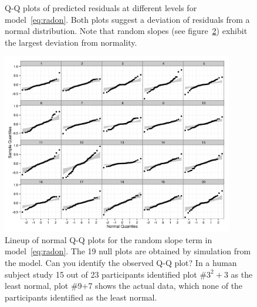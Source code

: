 \documentclass[12pt]{article} %
\begin{document}
\begin{figure}[!h]
	\centering
	\caption{\label{fig:qqplots1} Q-Q plots of predicted residuals at different levels %
	for model~\eqref{eq:radon}. Both plots suggest a deviation of residuals from a normal distribution. Note that random slopes (see figure~\ref{fig:lineup}) exhibit the largest deviation from normality. }
\end{figure}

\begin{figure}[htb]
	\centering
	\includegraphics[width=0.9\textwidth]{test.jpeg}%
	\caption{\label{fig:lineup} Lineup of normal Q-Q plots for the random slope term in model~\eqref{eq:radon}. The 19 null plots are obtained by simulation from the model. Can you identify the observed Q-Q plot?  In a human subject study 15 out of 23 participants identified plot \#$3^2+3$ as the least normal, plot \#9+7 shows the actual data, which none of the participants identified as the least normal. }
\end{figure}
\end{document}
